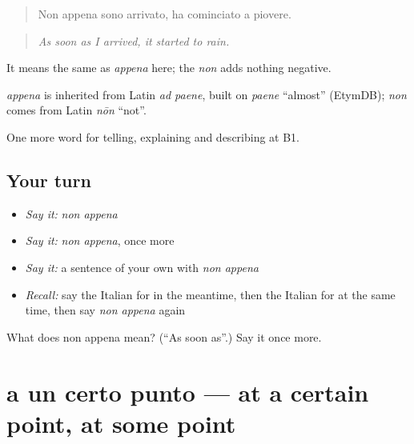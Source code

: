 \begin{quote}
Non appena sono arrivato, ha cominciato a piovere.
\end{quote}

\begin{quote}
\emph{As soon as I arrived, it started to rain.}
\end{quote}

It means the same as \emph{appena} here; the \emph{non} adds nothing negative.

\begin{cousinweb}
\emph{appena} is inherited from Latin \emph{ad paene}, built on \emph{paene} \textquotedblleft{}almost\textquotedblright{} (EtymDB); \emph{non} comes from Latin \emph{nōn} \textquotedblleft{}not\textquotedblright{}.
\end{cousinweb}

\begin{grammarlens}[title={What you've built}]
One more word for telling, explaining and describing at B1.
\end{grammarlens}

\subsection*{Your turn}
\begin{itemize}
\raggedright
  \item \emph{Say it:} \emph{non appena}
  \item \emph{Say it:} \emph{non appena}, once more
  \item \emph{Say it:} a sentence of your own with \emph{non appena}
  \item \emph{Recall:} say the Italian for in the meantime, then the Italian for at the same time, then say \emph{non appena} again
\end{itemize}

\begin{tcolorbox}[breakable,colback=teal!4,colframe=teal!35!black,title={Before you move on}]
What does non appena mean? (\textquotedblleft{}As soon as\textquotedblright{}.) Say it once more.
\end{tcolorbox}
\section[a un certo punto]{a un certo punto — at a certain point, at some point}

\label{lesson:IT-C274-a-un-certo-punto}



